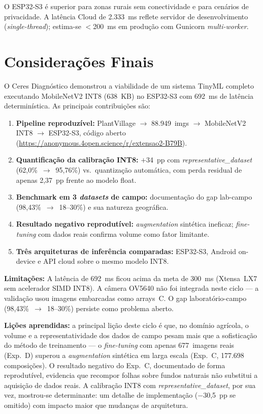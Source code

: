 \documentclass[12pt]{article}
\begin{document}
O ESP32-S3 é superior para zonas rurais sem conectividade e para cenários de
privacidade. A latência Cloud de 2.333~ms reflete servidor de desenvolvimento
(\textit{single-thread}); estima-se $<$200~ms em produção com Gunicorn \textit{multi-worker}.


\section{Considerações Finais}

O Ceres Diagnóstico demonstrou a viabilidade de um sistema TinyML completo
executando MobileNetV2 INT8 (638~KB) no ESP32-S3 com 692~ms de latência
determinística. As principais contribuições são:

\begin{enumerate}
  \item \textbf{Pipeline reproduzível:} PlantVillage $\to$ 88.949~imgs $\to$
        MobileNetV2 INT8 $\to$ ESP32-S3, código aberto
        (\url{https://anonymous.4open.science/r/extensao2-B79B}).
  \item \textbf{Quantificação da calibração INT8:} $+$34~pp com
        \textit{representative\_dataset} (62,0\%~$\to$~95,76\%) vs.\ quantização
        automática, com perda residual de apenas 2,37~pp frente ao modelo float.
  \item \textbf{Benchmark em 3 \textit{datasets} de campo:} documentação do gap
        lab-campo (98,43\%~$\to$~18--30\%) e sua natureza geográfica.
  \item \textbf{Resultado negativo reprodutível:} \textit{augmentation} sintética
        ineficaz; \textit{fine-tuning} com dados reais confirma volume como fator
        limitante.
  \item \textbf{Três arquiteturas de inferência comparadas:} ESP32-S3, Android
        on-device e API cloud sobre o mesmo modelo INT8.
\end{enumerate}

\textbf{Limitações:} A latência de 692~ms ficou acima da meta de 300~ms
(Xtensa~LX7 sem acelerador SIMD INT8). A câmera OV5640 não foi integrada neste
ciclo --- a validação usou imagens embarcadas como arrays~C. O gap
laboratório-campo (98,43\%~$\to$~18--30\%) persiste como problema aberto.

\textbf{Lições aprendidas:} a principal lição deste ciclo é que, no domínio
agrícola, o volume e a representatividade dos dados de campo pesam mais que a
sofisticação do método de treinamento --- o \textit{fine-tuning} com apenas
677~imagens reais (Exp.~D) superou a \textit{augmentation} sintética em larga escala
(Exp.~C, 177.698
composições). O resultado negativo do Exp.~C, documentado de forma reprodutível,
evidencia que recompor folhas sobre fundos naturais não substitui a aquisição de
dados reais. A calibração INT8 com \textit{representative\_dataset}, por sua vez,
mostrou-se determinante: um detalhe de implementação ($-$30,5~pp se omitido) com
impacto maior que mudanças de arquitetura.
\end{document}
